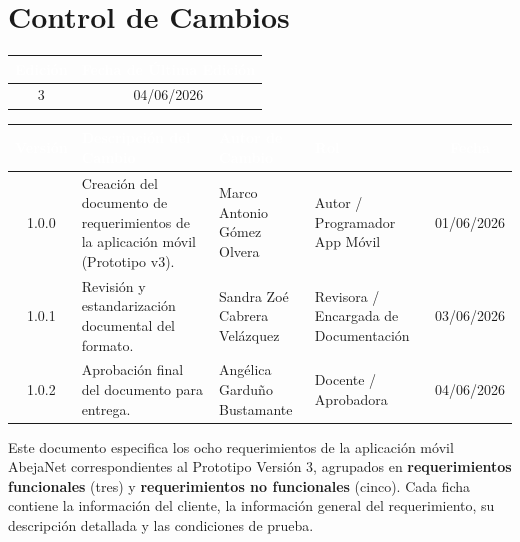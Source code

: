 \clearpage
\section{Control de Cambios}

\renewcommand{\arraystretch}{1.3}
\begin{flushright}
\begin{tabular}{|>{\columncolor{secVerde}}c|>{\columncolor{secVerde}}c|}
\hline
\textcolor{white}{\textbf{Edición}} & \textcolor{white}{\textbf{Fecha de Última Edición}} \\
\hline
\rowcolor{white}3 & 04/06/2026 \\
\hline
\end{tabular}
\end{flushright}

\vspace{0.4cm}

\begin{center}
\begin{tabular}{|c|p{4.5cm}|p{3.6cm}|p{2.8cm}|c|}
\hline
\rowcolor{secVerde}
\textcolor{white}{\textbf{Versión}} & \textcolor{white}{\textbf{Descripción del Cambio}} & \textcolor{white}{\textbf{Autor de Cambio}} & \textcolor{white}{\textbf{Rol}} & \textcolor{white}{\textbf{Fecha}} \\
\hline
1.0.0 & Creación del documento de requerimientos de la aplicación móvil (Prototipo v3). & Marco Antonio Gómez Olvera & Autor / Programador App Móvil & 01/06/2026 \\
\hline
1.0.1 & Revisión y estandarización documental del formato. & Sandra Zoé Cabrera Velázquez & Revisora / Encargada de Documentación & 03/06/2026 \\
\hline
1.0.2 & Aprobación final del documento para entrega. & Angélica Garduño Bustamante & Docente / Aprobadora & 04/06/2026 \\
\hline
\end{tabular}
\end{center}

\vspace{0.5cm}

Este documento especifica los ocho requerimientos de la aplicación móvil AbejaNet correspondientes al Prototipo Versión 3, agrupados en \textbf{requerimientos funcionales} (tres) y \textbf{requerimientos no funcionales} (cinco). Cada ficha contiene la información del cliente, la información general del requerimiento, su descripción detallada y las condiciones de prueba.

\clearpage
